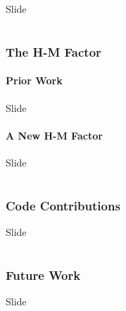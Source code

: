 \documentclass[hyphens,aspectratio=169]{beamer}
\begin{document}
\begin{frame}[fragile]{Slide}
\end{frame}

\part{}
\section{The H-M Factor}

\subsection{Prior Work}

\begin{frame}[fragile]{Slide}
\end{frame}

\subsection{A New H-M Factor}

\begin{frame}[fragile]{Slide}
\end{frame}

\part{}
\section{Code Contributions}

\begin{frame}[fragile]{Slide}
\end{frame}

\part{}
\section{Future Work}

\begin{frame}[fragile]{Slide}
\end{frame}
\end{document}
